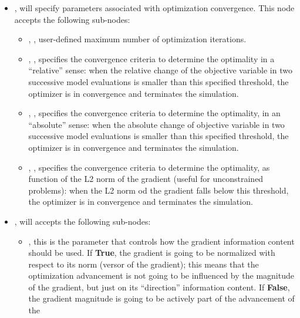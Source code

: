 \begin{itemize}
\item {},  will specify parameters associated with optimization 
convergence. This node accepts the following sub-nodes:
  \begin{itemize}
  \item {}, , user-defined maximum number of optimization iterations.
  \item {}, , specifies the convergence criteria to determine the optimality
  in a ``relative'' sense: when the relative change of the objective variable in two successive model evaluations is smaller than 
  this specified threshold, the  optimizer is in convergence and terminates the simulation. 
  \item {}, , specifies the convergence criteria to determine the optimality, 
  in an ``absolute'' sense: when the absolute change of objective variable in two successive model evaluations is smaller 
  than this specified threshold, the  optimizer is in convergence and terminates the simulation. 
   \item {}, , specifies the convergence criteria to determine the optimality, 
   as function of the L2 norm of the gradient (useful for unconstrained problems): when the L2 norm od the gradient falls below this threshold, the  optimizer is in convergence and terminates the simulation.
  \end{itemize}
\item {},  will accepts the following sub-nodes:
  \begin{itemize}
    \item {},  this is the parameter that controls how the gradient information 
    content should be used. If \textbf{True}, the gradient is going to be normalized with respect to its norm (versor of the gradient); 
    this means that the optimization advancement is not going to be influenced by the magnitude of the gradient, but just on its 
    ``direction'' information content. If \textbf{False}, the gradient magnitude is going to be actively part of the advancement of the

\end{itemize}
\end{itemize}
